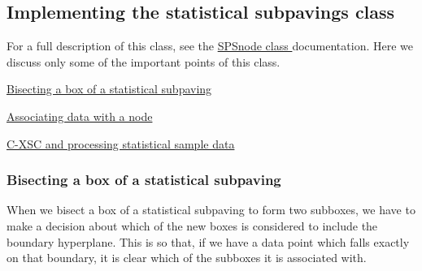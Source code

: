 \hypertarget{StatsSubPavings_statssec_technicalities}{}\subsection{\-Implementing the statistical subpavings class}\label{StatsSubPavings_statssec_technicalities}
\-For a full description of this class, see the \hyperlink{classsubpavings_1_1SPSnode}{\-S\-P\-Snode class } documentation. \-Here we discuss only some of the important points of this class.


\begin{DoxyItemize}
\item \hyperlink{StatsSubPavings_statssubsec_splitting}{\-Bisecting a box of a statistical subpaving}
\item \hyperlink{StatsSubPavings_statssubsec_data}{\-Associating data with a node}
\item \hyperlink{StatsSubPavings_statssubsec_accumulating}{\-C-\/\-X\-S\-C and processing statistical sample data}
\end{DoxyItemize}\hypertarget{StatsSubPavings_statssubsec_splitting}{}\subsubsection{\-Bisecting a box of a statistical subpaving}\label{StatsSubPavings_statssubsec_splitting}
\-When we bisect a box of a statistical subpaving to form two subboxes, we have to make a decision about which of the new boxes is considered to include the boundary hyperplane. \-This is so that, if we have a data point which falls exactly on that boundary, it is clear which of the subboxes it is associated with.

